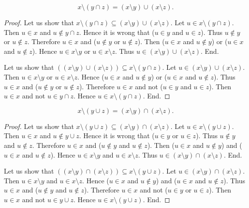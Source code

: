 \documentclass[../../set-theory.ftl.tex]{subfiles}
\begin{document}
  \begin{forthel}
    \begin{proposition}\label{SetTheory_01_01_339365}
      \[ x \setminus (y \cap z) = (x \setminus y) \cup (x \setminus z). \]
    \end{proposition}
    \begin{proof}
      Let us show that $x \setminus (y \cap z) \subseteq (x \setminus y) \cup (x \setminus z)$.
        Let $u \in x \setminus (y \cap z)$.
        Then $u \in x$ and $u \notin y \cap z$.
        Hence it is wrong that ($u \in y$ and $u \in z$).
        Thus $u \notin y$ or $u \notin z$.
        Therefore $u \in x$ and ($u \notin y$ or $u \notin z$).
        Then ($u \in x$ and $u \notin y$) or ($u \in x$ and $u \notin z$).
        Hence $u \in x \setminus y$ or $u \in x \setminus z$.
        Thus $u \in (x \setminus y) \cup (x \setminus z)$.
      End.

      Let us show that $((x \setminus y) \cup (x \setminus z)) \subseteq x \setminus (y \cap z)$.
        Let $u \in (x \setminus y) \cup (x \setminus z)$.
        Then $u \in x \setminus y$ or $u \in x \setminus z$.
        Hence ($u \in x$ and $u \notin y$) or ($u \in x$ and $u \notin z$).
        Thus $u \in x$ and ($u \notin y$ or $u \notin z$).
        Therefore $u \in x$ and not ($u \in y$ and $u \in z$).
        Then $u \in x$ and not $u \in y \cap z$.
        Hence $u \in x \setminus (y \cap z)$.
      End.
    \end{proof}

    \begin{proposition}\label{SetTheory_01_01_403962}
      \[ x \setminus (y \cup z) = (x \setminus y) \cap (x \setminus z). \]
    \end{proposition}
    \begin{proof}
      Let us show that $x \setminus (y \cup z) \subseteq (x \setminus y) \cap (x \setminus z)$.
        Let $u \in x \setminus (y \cup z)$.
        Then $u \in x$ and $u \notin y \cup z$.
        Hence it is wrong that ($u \in y$ or $u \in z$).
        Thus $u \notin y$ and $u \notin z$.
        Therefore $u \in x$ and ($u \notin y$ and $u \notin z$).
        Then ($u \in x$ and $u \notin y$) and ($u \in x$ and $u \notin z$).
        Hence $u \in x \setminus y$ and $u \in x \setminus z$.
        Thus $u \in (x \setminus y) \cap (x \setminus z)$.
      End.

      Let us show that $((x \setminus y) \cap (x \setminus z)) \subseteq x \setminus (y \cup z)$.
        Let $u \in (x \setminus y) \cap (x \setminus z)$.
        Then $u \in x \setminus y$ and $u \in x \setminus z$.
        Hence ($u \in x$ and $u \notin y$) and ($u \in x$ and $u \notin z$).
        Thus $u \in x$ and ($u \notin y$ and $u \notin z$).
        Therefore $u \in x$ and not ($u \in y$ or $u \in z$).
        Then $u \in x$ and not $u \in y \cup z$.
        Hence $u \in x \setminus (y \cup z)$.
      End.
    \end{proof}
  \end{forthel}
\end{document}
